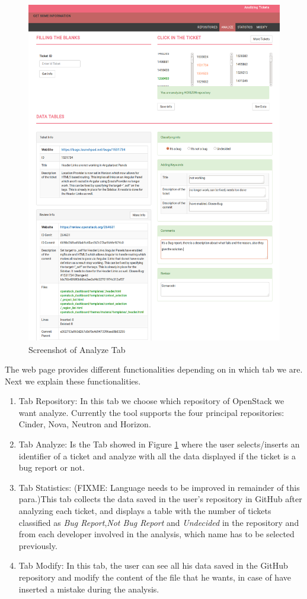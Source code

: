 \documentclass[ifip]{svmult}
\begin{document}
\begin{figure}
\centering
\includegraphics[height=15cm]{index2.png}
\caption{Screenshot of Analyze Tab}
\label{fig:2}       %
\end{figure}

The web page provides different functionalities depending on in which tab we are. Next we explain these functionalities.
\begin{enumerate}
  \item Tab Repository: In this tab we choose which repository of OpenStack we want analyze. Currently the tool supports the four principal repositories: Cinder, Nova, Neutron and Horizon.
  \item Tab Analyze: Is the Tab showed in Figure \ref{fig:2} where the user selects/inserts an identifier of a ticket and analyze with all the data displayed if the ticket is a bug report or not.
  \item Tab Statistics: (FIXME: Language needs to be improved in remainder of this para.)This tab collects the data saved in the user's repository in GitHub after analyzing each ticket, and displays a table with the number of tickets classified as \textit{Bug Report},\textit{Not Bug Report} and \textit{Undecided} in the repository and from each developer involved in the analysis, which name has to be selected previously.
  \item Tab Modify: In this tab, the user can see all his data saved in the GitHub repository and modify the content of the file that he wants, in case of have inserted a mistake during the analysis.
\end{enumerate}
\end{document}
